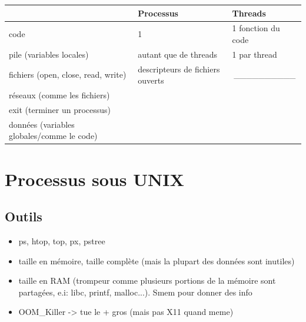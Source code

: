 \documentclass[11pt]{article}
\begin{document}
\begin{table}[h!]
	\begin{tabular}{l|l|l|}
		\cline{2-3}
		                                                                 & Processus                        & Threads                                   \\ \hline
		\multicolumn{1}{|l|}{code}                                       & 1                                & 1 fonction du code                        \\ \hline
		\multicolumn{1}{|l|}{pile (variables locales)}                   & autant que de threads            & 1 par thread                              \\ \hline
		\multicolumn{1}{|l|}{fichiers (open, close, read, write)}        & descripteurs de fichiers ouverts & \multicolumn{1}{c|}{\_\_\_\_\_\_\_\_\_\_} \\ \hline
		\multicolumn{1}{|l|}{réseaux (comme les fichiers)}               &                                  &                                           \\ \hline
		\multicolumn{1}{|l|}{exit (terminer un processus)}               &                                  &                                           \\ \hline
		\multicolumn{1}{|l|}{données (variables globales/comme le code)} &                                  &                                           \\ \hline
	\end{tabular}
\end{table}

\pagebreak

\section{Processus sous UNIX}
\subsection{Outils}
\begin{itemize}
	\item ps,
	      htop,
	      top,
	      px,
	      pstree
	\item taille en mémoire, taille complète (mais la plupart des données sont inutiles)
	\item taille en RAM (trompeur comme plusieurs portions de la mémoire sont partagées, e.i: libc, printf, malloc...). Smem pour donner des info
	\item OOM\_Killer -> tue le + gros (mais pas X11 quand meme)
\end{itemize}
\end{document}
